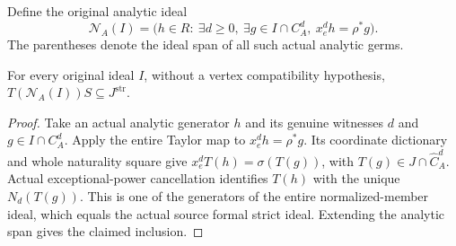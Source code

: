 \begin{definition}
\label{hir:actual-analytic-normalized-member-ideal}
\leanok
Define the original analytic ideal
\[
 \mathcal N_A(I)=
 \bigl(h\in R:\ \exists d\geq0,\ \exists g\in I\cap C_A^d,
                       \ x_e^dh=\rho^*g\bigr).
\]
The parentheses denote the ideal span of all such actual analytic germs.
\end{definition}

\begin{lemma}
\label{hir:actual-analytic-normalized-member-formal-inclusion}
\leanok
For every original ideal $I$, without a vertex compatibility hypothesis,
$T(\mathcal N_A(I))S\subseteq J^{\mathrm{str}}$.
\end{lemma}
\begin{proof}
Take an actual analytic generator $h$ and its genuine witnesses $d$ and
$g\in I\cap C_A^d$. Apply the entire Taylor map to
$x_e^dh=\rho^*g$. Its coordinate dictionary and whole naturality square give
$x_e^dT(h)=\sigma(T(g))$, with $T(g)\in J\cap\widehat C_A^d$.
Actual exceptional-power cancellation identifies $T(h)$ with the unique
$N_d(T(g))$. This is one of the generators of the entire normalized-member
ideal, which equals the actual source formal strict ideal. Extending the
analytic span gives the claimed inclusion.
\end{proof}

